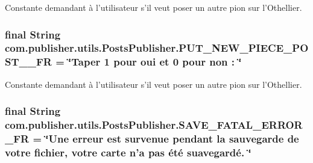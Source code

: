 Constante demandant à l'utilisateur s'il veut poser un autre pion sur l'Othellier. \hypertarget{interfacecom_1_1publisher_1_1utils_1_1PostsPublisher_a6d9b06488e191feae24c934fee998603}{
\subsubsection[{P\-U\-T\-\_\-\-N\-E\-W\-\_\-\-P\-I\-E\-C\-E\-\_\-\-P\-O\-S\-T\-\_\-2\-\_\-\-F\-R}]{\setlength{\rightskip}{0pt plus 5cm}final String com.\-publisher.\-utils.\-Posts\-Publisher.\-P\-U\-T\-\_\-\-N\-E\-W\-\_\-\-P\-I\-E\-C\-E\-\_\-\-P\-O\-S\-T\-\_\-\_\-\-F\-R = \char`\"{}Taper 1 pour oui et 0 pour non \-: \char`\"{}\hspace{0.3cm}{\ttfamily [static]}}}\label{interfacecom_1_1publisher_1_1utils_1_1PostsPublisher_a6d9b06488e191feae24c934fee998603}
Constante demandant à l'utilisateur s'il veut poser un autre pion sur l'Othellier. \hypertarget{interfacecom_1_1publisher_1_1utils_1_1PostsPublisher_aee8873fc53cc04fc1aede9bc30f9f2ab}{
\subsubsection[{S\-A\-V\-E\-\_\-\-F\-A\-T\-A\-L\-\_\-\-E\-R\-R\-O\-R\-\_\-\-F\-R}]{\setlength{\rightskip}{0pt plus 5cm}final String com.\-publisher.\-utils.\-Posts\-Publisher.\-S\-A\-V\-E\-\_\-\-F\-A\-T\-A\-L\-\_\-\-E\-R\-R\-O\-R\-\_\-\-F\-R = \char`\"{}Une erreur est survenue pendant la sauvegarde de votre fichier, votre carte n'a pas été suavegardé. \char`\"{}\hspace{0.3cm}{\ttfamily [static]}}}\label{interfacecom_1_1publisher_1_1utils_1_1PostsPublisher_aee8873fc53cc04fc1aede9bc30f9f2ab}
